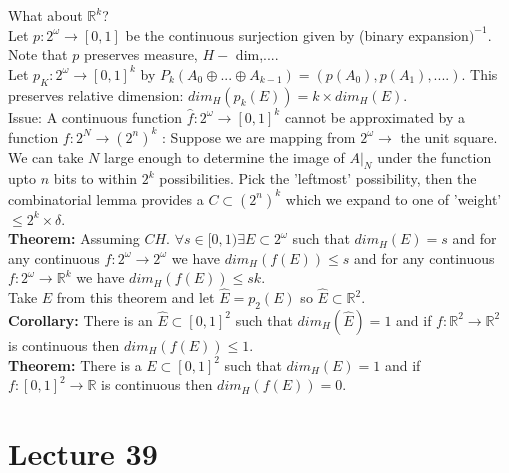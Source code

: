 \documentclass{article}
\newcommand{\bb}{\mathbb}
\begin{document}
   What about $\bb R^k$?\\
   Let $p: 2^\omega \to [0,1]$ be the continuous surjection given by (binary expansion$)^{-1}$. Note that $p$ preserves measure, $H-$ dim,....\\
   Let $p_K: 2^\omega \to [0,1]^k$ by $P_k(A_0 \oplus ... \oplus A_{k-1}) = (p(A_0),p(A_1),....)$. This preserves relative dimension: $dim_H(p_k(E)) = k\times  dim_H(E)$.\\
   Issue: A continuous function $\hat f: 2^\omega \to [0,1]^k$ cannot be approximated by a function $f: 2^N \to (2^n)^k$ : Suppose we are mapping from $2^\omega \to $ the unit square. We can take $N$ large enough to determine the image of $A|_N$ under the function upto $n$ bits to within $2^k$ possibilities. Pick the 'leftmost' possibility, then the combinatorial lemma provides a $C \subset (2^n)^k$ which we expand to one of 'weight' $\leq 2^k \times \delta$.\\
   \textbf{Theorem:} Assuming $CH$. $\forall s \in [0,1) \exists E \subset 2^\omega$ such that $dim_H(E) = s$ and for any continuous $f: 2^\omega \to 2^\omega$ we have $dim_H(f(E)) \leq s$ and for any continuous $f: 2^\omega \to \bb R^k$ we have $dim_H(f(E)) \leq sk$.
   \\
   Take $E$ from this theorem and let $\hat E = p_2(E)$ so $\hat E \subset \bb R^2$.\\
   \textbf{Corollary:} There is an $\hat E \subset [0,1]^2$ such that $dim_H(\hat E) = 1$ and if $f: \bb R^2 \to \bb R^2$ is continuous then $dim_H(f(E)) \leq 1$.\\
   \textbf{Theorem:} There is a $E \subset [0,1]^2$ such that $dim_H(E) =1 $ and if $f: [0,1]^2 \to \bb R$ is continuous then $dim_H(f(E)) = 0$.\newpage
   \section{Lecture 39}
   
   
    
\end{document}
